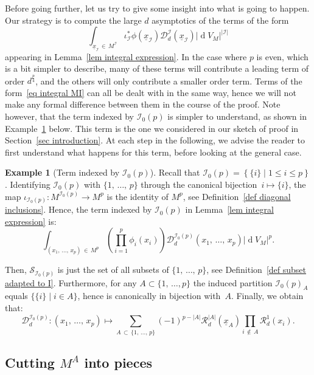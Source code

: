 \documentclass[10pt]{amsart}
\theoremstyle{definition}\newtheorem{defi}[theo]{Definition}\newtheorem{rema}[theo]{Remark}\newtheorem{exam}[theo]{Example}\newtheorem{exem}[theo]{Example}\newtheorem{nota}[theo]{Notation}
\DeclareMathOperator{\dmesure}{d}
\newcommand{\D}{\mathcal{D}}
\newcommand{\I}{\mathcal{I}}
\newcommand{\clR}{\mathcal{R}}
\newcommand{\clS}{\mathcal{S}}
\newcommand{\mvert}{\mathrel{}\middle|\mathrel{}}
\newcommand{\norm}[1]{\left\lvert #1 \right\rvert}
\newcommand{\rmes}[1]{\norm{\dmesure\! V_{#1}}}
\renewcommand{\leq}{\leqslant}
\begin{document}
Before going further, let us try to give some insight into what is going to happen. Our strategy is to compute the large $d$ asymptotics of the terms of the form
\begin{equation}\label{eq integral MI}
\int_{\underline{x}_\I\,\in\,M^\I} \iota_\I^*\phi\left(\underline{x}_\I\right) \D^\I_d(\underline{x}_\I) \rmes{M}^{\norm{\I}}
\end{equation}
appearing in Lemma~\ref{lem integral expression}. In the case where $p$ is even, which is a bit simpler to describe, many of these terms will contribute a leading term of order $d^\frac{p}{4}$, and the others will only contribute a smaller order term. Terms of the form~\eqref{eq integral MI} can all be dealt with in the same way, hence we will not make any formal difference between them in the course of the proof. Note however, that the term indexed by $\I_0(p)$ is simpler to understand, as shown in Example~\ref{ex term I0} below. This term is the one we considered in our sketch of proof in Section~\ref{sec introduction}. At each step in the following, we advise the reader to first understand what happens for this term, before looking at the general case.

\begin{exam}[Term indexed by $\I_0(p)$]\label{ex term I0}
Recall that $\I_0(p) = \left\{\{i\} \mvert 1 \leq i \leq p \right\}$. Identifying $\I_0(p)$ with $\{1,\,\dots,\,p\}$ through the canonical bijection~$i \mapsto \{i\}$, the map $\iota_{\I_0(p)}:M^{\I_0(p)} \to M^p$ is the identity of $M^p$, see Definition~\ref{def diagonal inclusions}. Hence, the term indexed by $\I_0(p)$ in Lemma~\ref{lem integral expression} is:
\[
\int_{\left(x_1,\,\dots,\,x_p\right)\,\in\,M^p} \left(\prod_{i=1}^p\phi_i(x_i)\right) \D_d^{\I_0(p)}\left(x_1,\,\dots,\,x_p\right) \rmes{M}^p.
\]

Then, $\clS_{\I_0(p)}$ is just the set of all subsets of $\{1,\,\dots,\,p\}$, see Definition~\ref{def subset adapted to I}. Furthermore, for any $A \subset \{1,\,\dots,p\}$ the induced partition $\I_0(p)_A$ equals $\{\{i\} \mid i \in A\}$, hence is canonically in bijection with~$A$. Finally, we obtain that:
\[
\D_d^{\I_0(p)} : (x_1,\,\dots,\,x_p) \longmapsto \sum_{A\,\subset\,\{1,\,\dots,\,p\}} (-1)^{p-\norm{A}} \clR_d^{\norm{A}}(\underline{x}_A) \prod_{i\,\notin\,A} \clR^1_d(x_i).
\]
\end{exam}



\subsection{Cutting \texorpdfstring{$M^A$}{} into pieces}\label{subsec cutting MA into pieces}
\end{document}
